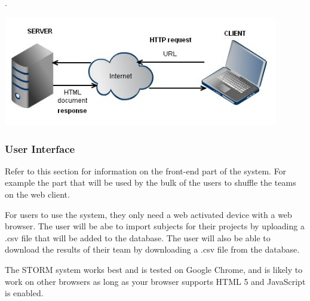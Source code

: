 .\par
	\vspace{0.3cm}
	

\includegraphics[width=0.9\textwidth]{./graphics/LinuxServer.jpg}

\subsubsection{User Interface}
	Refer to this section for information on the front-end part of the system. For example the part that will be used by the bulk of the users to shuffle the teams on the web client.\par
	\vspace{0.3cm}
	
For users to use the system, they only need a web activated device with a web browser. The user will be abe to import subjects for their projects by uploading a .csv file that will be added to the database. The user will also be able to download the results of their team by downloading a .csv file from the database.

The STORM system works best and is tested on Google Chrome, and is likely to work on other browsers as long as your browser supports HTML 5 and JavaScript is enabled.